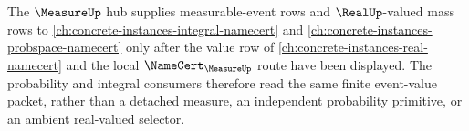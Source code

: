The $\MeasureUp$ hub supplies measurable-event rows and $\RealUp$-valued mass rows to \autoref{ch:concrete-instances-integral-namecert} and \autoref{ch:concrete-instances-probspace-namecert} only after the value row of \autoref{ch:concrete-instances-real-namecert} and the local $\NameCert_{\MeasureUp}$ route have been displayed. The probability and integral consumers therefore read the same finite event-value packet, rather than a detached measure, an independent probability primitive, or an ambient real-valued selector.
